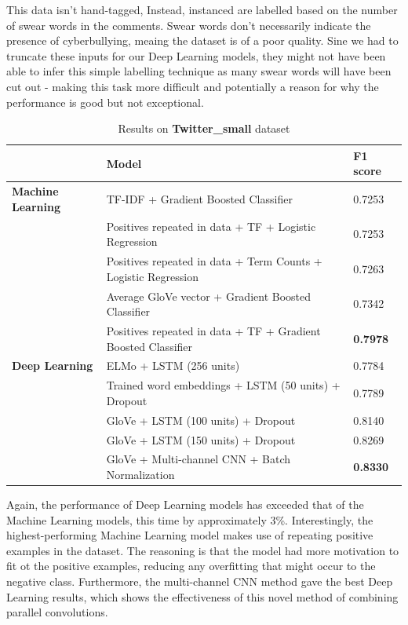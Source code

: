 \documentclass[12pt,a4paper]{article}
\begin{document}
This data isn't hand-tagged, Instead, instanced are labelled based on the number of swear words in the comments. Swear words don't necessarily indicate the presence of cyberbullying, meaing the dataset is of a poor quality. Sine we had to truncate these inputs for our Deep Learning models, they might not have been able to infer this simple labelling technique as many swear words will have been cut out - making this task more difficult and potentially a reason for why the performance is good but not exceptional.

\begin{table}[H]
	\centering
	\vspace*{-12pt}
	\caption{Results on \textbf{Twitter\_small} dataset}
	\label{results2}
	\hspace*{-0.8cm}
	\begin{tabular}{p{3.4cm} p{11cm} p{2cm}} \hline\hline
		& \textbf{Model} & \textbf{F1 score}  \\ \hline
		\textbf{Machine Learning} & TF-IDF + Gradient Boosted Classifier & 0.7253 \\
		& Positives repeated in data + TF + Logistic Regression & 0.7253 \\
		& Positives repeated in data + Term Counts + Logistic Regression & 0.7263 \\
		& Average GloVe vector + Gradient Boosted Classifier & 0.7342 \\
		& Positives repeated in data + TF + Gradient Boosted Classifier & \textbf{0.7978} \\ \hline
		
		\textbf{Deep Learning} & ELMo + LSTM (256 units) & 0.7784 \\
		& Trained word embeddings + LSTM (50 units) + Dropout & 0.7789 \\
		& GloVe + LSTM (100 units) + Dropout & 0.8140 \\ 
		& GloVe + LSTM (150 units) + Dropout & 0.8269 \\
		& GloVe + Multi-channel CNN + Batch Normalization & \textbf{0.8330} \\ \hline
	\end{tabular}
\end{table}

Again, the performance of Deep Learning models has exceeded that of the Machine Learning models, this time by approximately 3\%. Interestingly, the highest-performing Machine Learning model makes use of repeating positive examples in the dataset. The reasoning is that the model had more motivation to fit ot the positive examples, reducing any overfitting that might occur to the negative class. Furthermore, the multi-channel CNN method gave the best Deep Learning results, which shows the effectiveness of this novel method of combining parallel convolutions. 
\end{document}
